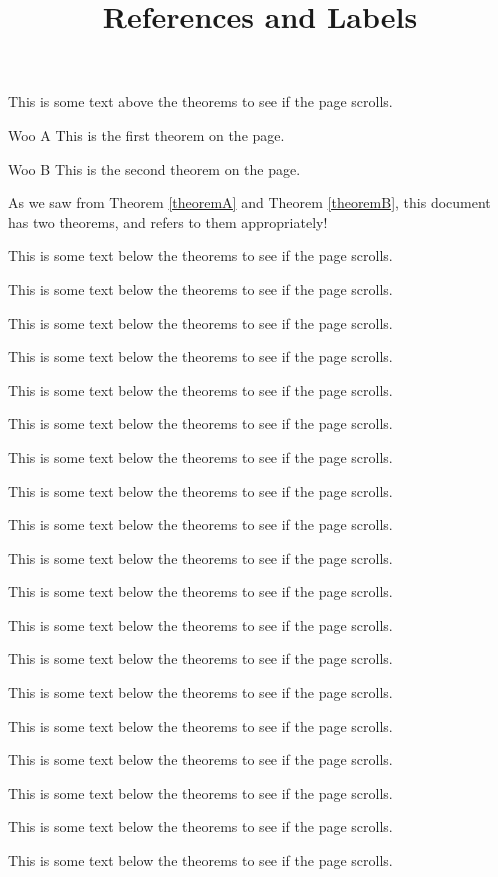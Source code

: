 \documentclass{ximera}
\begin{document}
\title{References and Labels}

This is some text above the theorems to see if the page scrolls.

\begin{theorem}{Woo A}
\label{theoremA} This is the first theorem on the page.
\end{theorem}

\begin{theorem}{Woo B}
\label{theoremB} This is the second theorem on the page.
\end{theorem}

As we saw from Theorem \ref{theoremA} and Theorem \ref{theoremB}, this document has two theorems, and refers to them appropriately!

This is some text below the theorems to see if the page scrolls.

This is some text below the theorems to see if the page scrolls.

This is some text below the theorems to see if the page scrolls.

This is some text below the theorems to see if the page scrolls.

This is some text below the theorems to see if the page scrolls.

This is some text below the theorems to see if the page scrolls.

This is some text below the theorems to see if the page scrolls.

This is some text below the theorems to see if the page scrolls.

This is some text below the theorems to see if the page scrolls.

This is some text below the theorems to see if the page scrolls.

This is some text below the theorems to see if the page scrolls.

This is some text below the theorems to see if the page scrolls.

This is some text below the theorems to see if the page scrolls.

This is some text below the theorems to see if the page scrolls.

This is some text below the theorems to see if the page scrolls.

This is some text below the theorems to see if the page scrolls.

This is some text below the theorems to see if the page scrolls.

This is some text below the theorems to see if the page scrolls.

This is some text below the theorems to see if the page scrolls.
\end{document}
